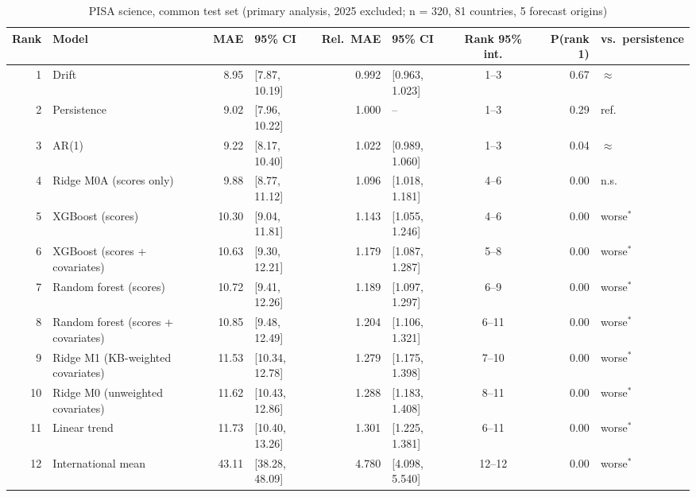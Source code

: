\begin{table}[htbp]
\centering
\footnotesize
\caption{PISA science, common test set (primary analysis, 2025 excluded; n = 320, 81 countries, 5 forecast origins)}
\label{tab:A4}
\begin{tabular}{rlrlrlcrl}
\toprule
Rank & Model & MAE & 95\% CI & Rel.\ MAE & 95\% CI & Rank 95\% int. & P(rank 1) & vs.\ persistence \\
\midrule
1 & Drift & 8.95 & [7.87, 10.19] & 0.992 & [0.963, 1.023] & 1--3 & 0.67 & $\approx$ \\
2 & Persistence & 9.02 & [7.96, 10.22] & 1.000 & -- & 1--3 & 0.29 & ref. \\
3 & AR(1) & 9.22 & [8.17, 10.40] & 1.022 & [0.989, 1.060] & 1--3 & 0.04 & $\approx$ \\
4 & Ridge M0A (scores only) & 9.88 & [8.77, 11.12] & 1.096 & [1.018, 1.181] & 4--6 & 0.00 & n.s. \\
5 & XGBoost (scores) & 10.30 & [9.04, 11.81] & 1.143 & [1.055, 1.246] & 4--6 & 0.00 & worse$^{*}$ \\
6 & XGBoost (scores + covariates) & 10.63 & [9.30, 12.21] & 1.179 & [1.087, 1.287] & 5--8 & 0.00 & worse$^{*}$ \\
7 & Random forest (scores) & 10.72 & [9.41, 12.26] & 1.189 & [1.097, 1.297] & 6--9 & 0.00 & worse$^{*}$ \\
8 & Random forest (scores + covariates) & 10.85 & [9.48, 12.49] & 1.204 & [1.106, 1.321] & 6--11 & 0.00 & worse$^{*}$ \\
9 & Ridge M1 (KB-weighted covariates) & 11.53 & [10.34, 12.78] & 1.279 & [1.175, 1.398] & 7--10 & 0.00 & worse$^{*}$ \\
10 & Ridge M0 (unweighted covariates) & 11.62 & [10.43, 12.86] & 1.288 & [1.183, 1.408] & 8--11 & 0.00 & worse$^{*}$ \\
11 & Linear trend & 11.73 & [10.40, 13.26] & 1.301 & [1.225, 1.381] & 6--11 & 0.00 & worse$^{*}$ \\
12 & International mean & 43.11 & [38.28, 48.09] & 4.780 & [4.098, 5.540] & 12--12 & 0.00 & worse$^{*}$ \\
\bottomrule
\end{tabular}
\par{}
\end{table}
